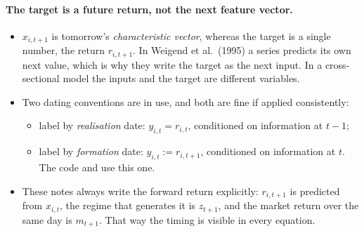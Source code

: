 \paragraph{The target is a future return, not the next feature vector.}
\begin{itemize}
  \item $x_{i,t+1}$ is tomorrow's \emph{characteristic vector}, whereas the target is a single number, the return $r_{i,t+1}$. In Weigend et al.\ (1995) a series predicts its own next value, which is why they write the target as the next input. In a cross-sectional model the inputs and the target are different variables.
  \item Two dating conventions are in use, and both are fine if applied consistently:
  \begin{itemize}
    \item label by \emph{realisation} date: $y_{i,t}=r_{i,t}$, conditioned on information at $t-1$;
    \item label by \emph{formation} date: $y_{i,t}:=r_{i,t+1}$, conditioned on information at $t$. The code and  use this one.
  \end{itemize}
  \item These notes always write the forward return explicitly: $r_{i,t+1}$ is predicted from $x_{i,t}$, the regime that generates it is $z_{t+1}$, and the market return over the same day is $m_{t+1}$. That way the timing is visible in every equation.
\end{itemize}
